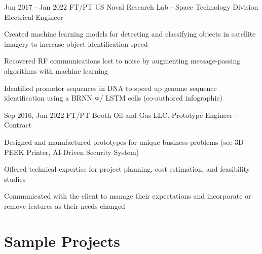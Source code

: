 \documentclass[
	10pt, %
]{FreemanCV}
\begin{document}

\jobentry
	{Jun 2017 - Jan 2022} %
	{FT/PT} %
	{US Naval Research Lab - Space Technology Division} %
	{Electrical Engineer} %
	{ %
		\item Created machine learning models for detecting and classifying objects in satellite imagery to increase object identification speed
		\item Recovered RF communications lost to noise by augmenting message-passing algorithms with machine learning
		\item Identified promotor sequences in DNA to speed up genome sequence identification using a BRNN w/ LSTM cells (co-authored infographic)
	} 


\jobentry
	{Sep 2016, Jun 2022} %
	{FT/PT} %
	{Booth Oil and Gas LLC.} %
	{Prototype Engineer - Contract} %
	{ %
		\item Designed and manufactured prototypes for unique business problems (see 3D PEEK Printer, AI-Driven Security System)
		\item Offered technical expertise for project planning, cost estimation, and feasibility studies
		\item Communicated with the client to manage their expectations and incorporate or remove features as their needs changed
	}
	





\vspace*{-10pt}
\section{Sample Projects}
\setlength{\columnsep}{10pt}
\end{document}
